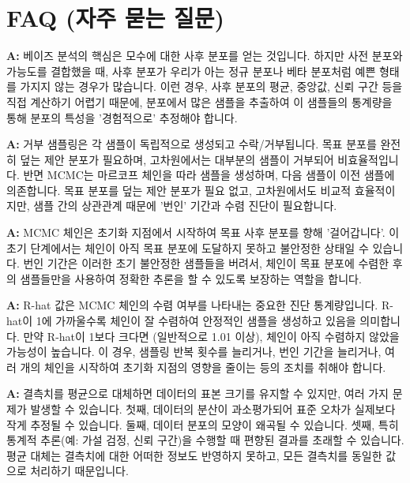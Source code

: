 \documentclass[11pt,a4paper]{article}
\theoremstyle{definition}
\newcommand{\newsection}[1]{\newpage\section{#1}}
\begin{document}
\newsection{FAQ (자주 묻는 질문)}

\begin{tcolorbox}[infobox, title={Q: 왜 베이즈 분석에서 사후 분포를 샘플링해야 하나요?}]
\textbf{A:} 베이즈 분석의 핵심은 모수에 대한 사후 분포를 얻는 것입니다. 하지만 사전 분포와 가능도를 결합했을 때, 사후 분포가 우리가 아는 정규 분포나 베타 분포처럼 예쁜 형태를 가지지 않는 경우가 많습니다. 이런 경우, 사후 분포의 평균, 중앙값, 신뢰 구간 등을 직접 계산하기 어렵기 때문에, 분포에서 많은 샘플을 추출하여 이 샘플들의 통계량을 통해 분포의 특성을 '경험적으로' 추정해야 합니다.
\end{tcolorbox}

\begin{tcolorbox}[infobox, title={Q: 거부 샘플링과 MCMC의 주요 차이점은 무엇인가요?}]
\textbf{A:} 거부 샘플링은 각 샘플이 독립적으로 생성되고 수락/거부됩니다. 목표 분포를 완전히 덮는 제안 분포가 필요하며, 고차원에서는 대부분의 샘플이 거부되어 비효율적입니다. 반면 MCMC는 마르코프 체인을 따라 샘플을 생성하며, 다음 샘플이 이전 샘플에 의존합니다. 목표 분포를 덮는 제안 분포가 필요 없고, 고차원에서도 비교적 효율적이지만, 샘플 간의 상관관계 때문에 '번인' 기간과 수렴 진단이 필요합니다.
\end{tcolorbox}

\begin{tcolorbox}[infobox, title={Q: MCMC에서 '번인(Burn-in)' 기간은 왜 필요한가요?}]
\textbf{A:} MCMC 체인은 초기화 지점에서 시작하여 목표 사후 분포를 향해 '걸어갑니다'. 이 초기 단계에서는 체인이 아직 목표 분포에 도달하지 못하고 불안정한 상태일 수 있습니다. 번인 기간은 이러한 초기 불안정한 샘플들을 버려서, 체인이 목표 분포에 수렴한 후의 샘플들만을 사용하여 정확한 추론을 할 수 있도록 보장하는 역할을 합니다.
\end{tcolorbox}

\begin{tcolorbox}[infobox, title={Q: MCMC 결과에서 'R-hat' 값이 1보다 크면 어떻게 해야 하나요?}]
\textbf{A:} R-hat 값은 MCMC 체인의 수렴 여부를 나타내는 중요한 진단 통계량입니다. R-hat이 1에 가까울수록 체인이 잘 수렴하여 안정적인 샘플을 생성하고 있음을 의미합니다. 만약 R-hat이 1보다 크다면 (일반적으로 1.01 이상), 체인이 아직 수렴하지 않았을 가능성이 높습니다. 이 경우, 샘플링 반복 횟수를 늘리거나, 번인 기간을 늘리거나, 여러 개의 체인을 시작하여 초기화 지점의 영향을 줄이는 등의 조치를 취해야 합니다.
\end{tcolorbox}

\begin{tcolorbox}[infobox, title={Q: 결측치를 단순히 평균으로 대체하는 것이 왜 문제가 될 수 있나요?}]
\textbf{A:} 결측치를 평균으로 대체하면 데이터의 표본 크기를 유지할 수 있지만, 여러 가지 문제가 발생할 수 있습니다. 첫째, 데이터의 분산이 과소평가되어 표준 오차가 실제보다 작게 추정될 수 있습니다. 둘째, 데이터 분포의 모양이 왜곡될 수 있습니다. 셋째, 특히 통계적 추론(예: 가설 검정, 신뢰 구간)을 수행할 때 편향된 결과를 초래할 수 있습니다. 평균 대체는 결측치에 대한 어떠한 정보도 반영하지 못하고, 모든 결측치를 동일한 값으로 처리하기 때문입니다.
\end{tcolorbox}
\end{document}
